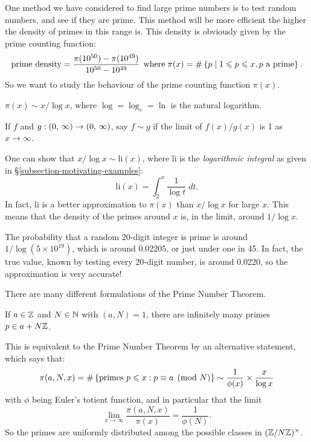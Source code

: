 \documentclass{article}
\begin{document}
One method we have considered to find large prime numbers is to test random numbers, and see if they are prime. This method will be more efficient the higher the density of primes in this range is. This density is obviously given by the prime counting function:
\[
\text{prime density} = \frac{\pi(10^{50}) - \pi(10^{49})}{10^{50} - 10^{49}}
\mathrel{\, \text{where}} \pi (x) = \# \left\lbrace p \mid 1 \leqslant p \leqslant x, p \text{ a prime} \right\rbrace.
\]
So we want to study the behaviour of the prime counting function $\pi(x)$.

\begin{theorem}
	\label{prime-number-theorem}
    $\pi(x) \sim x / \log x$, where $\log = \log_e = \ln$ is the natural logarithm.
\end{theorem}

\begin{note}
	If $f$ and $g: (0, \, \infty) \to (0, \, \infty)$, say $f \sim g$ if the limit of $f(x)/g(x)$ is 1 as $x \to \infty$.
\end{note}

One can show that $x / \log x \sim \mathrm{li}(x)$, where $\mathrm{li}$ is the \textit{logarithmic integral} as given in \S\ref{subsection-motivating-examples}:
\[
\mathrm{li}(x) = \int_2^x \frac{1}{\log t} \; dt.
\]
In fact, $\mathrm{li}$ is a better approximation to $\pi(x)$ than $x/\log x$ for large $x$. This means that the density of the primes around $x$ is, in the limit, around $1/\log x$.

\begin{corollary}
    The probability that a random 20-digit integer is prime is around $1/\log(5 \times 10^{19})$, which is around 0.02205, or just under one in 45. In fact, the true value, known by testing every 20-digit number, is around 0.0220, so the approximation is very accurate!
\end{corollary}

There are many different formulations of the Prime Number Theorem.

\begin{theorem}
    If $a \in \mathbb{Z}$ and $N \in \mathbb{N}$ with $(a, N) = 1$, there are infinitely many primes $p \in a + N\mathbb{Z}$.
\end{theorem}

This is equivalent to the Prime Number Theorem by an alternative statement, which says that:
\[
\pi(a, N, x) = \#\left\lbrace \text{primes } p \leqslant x : p \equiv a \pmod N \right\rbrace
\sim \frac{1}{\phi(x)} \times \frac{x}{\log x}
\]
with $\phi$ being Euler's totient function, and in particular that the limit
\[
\lim_{x \to \infty} \frac{\pi(a, N, x)}{\pi(x)} = \frac{1}{\phi(N)}.
\]
So the primes are uniformly distributed among the possible classes in $(\mathbb{Z}/N\mathbb{Z})^\times$.
\end{document}
